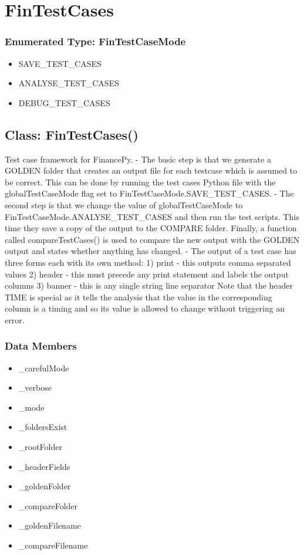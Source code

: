 \documentclass[twoside,11pt]{book}
\begin{document}
\newpage
\section{FinTestCases}

\subsubsection{Enumerated Type: FinTestCaseMode}
\begin{itemize}
\item{SAVE\_TEST\_CASES}
\item{ANALYSE\_TEST\_CASES}
\item{DEBUG\_TEST\_CASES}
\end{itemize}

\subsection*{Class: FinTestCases()}
Test case framework for FinancePy. - The basic step is that we generate a GOLDEN folder that creates an output file for each testcase which is assumed to be correct. This can be done by running the test cases Python file with the globalTestCaseMode flag set to FinTestCaseMode.SAVE\_TEST\_CASES. - The second step is that we change the value of globalTestCaseMode to FinTestCaseMode.ANALYSE\_TEST\_CASES and then run the test scripts. This time they save a copy of the output to the COMPARE folder. Finally, a function called compareTestCases() is used to compare the new output with the GOLDEN output and states whether anything has changed.  - The output of a test case has three forms each with its own method:  1) print - this outputs comma separated values 2) header - this must precede any print statement and labels the output columns 3) banner - this is any single string line separator  Note that the header TIME is special as it tells the analysis that the value in the corresponding column is a timing and so its value is allowed to change without triggering an error. 

\subsubsection*{Data Members}
\begin{itemize}
\item{\_carefulMode}
\item{\_verbose}
\item{\_mode}
\item{\_foldersExist}
\item{\_rootFolder}
\item{\_headerFields}
\item{\_goldenFolder}
\item{\_compareFolder}
\item{\_goldenFilename}
\item{\_compareFilename}
\end{itemize}
\end{document}
